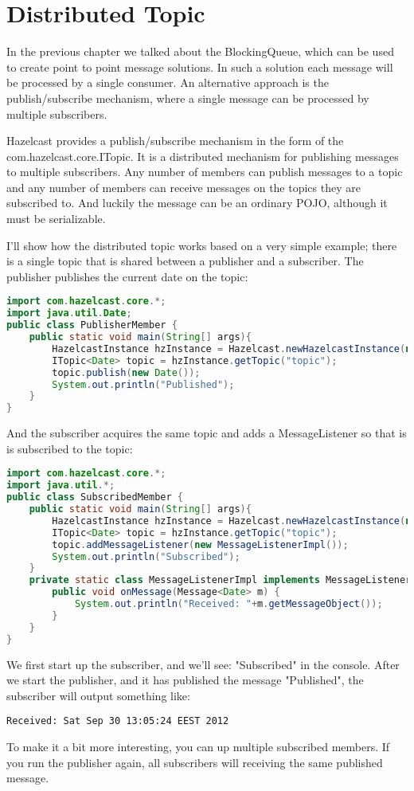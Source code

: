 \chapter{Distributed Topic}
In the previous chapter we talked about the BlockingQueue, which can be used to create point to point message solutions. In such a solution each message will be processed by a single consumer. An alternative approach is the publish/subscribe mechanism, where a single message can be processed by multiple subscribers.

Hazelcast provides a publish/subscribe mechanism in the form of the com.hazelcast.core.ITopic. It is a distributed mechanism for publishing messages to multiple subscribers. Any number of members can publish messages to a topic and any number of members can receive messages on the topics they are subscribed to. And luckily the message can be an ordinary POJO, although it must be serializable. 

I'll show how the distributed topic works based on a very simple example; there is a single topic that is shared between a publisher and a subscriber. The publisher publishes the current date on the topic:
\begin{lstlisting}[language=java]
import com.hazelcast.core.*;
import java.util.Date;
public class PublisherMember {
    public static void main(String[] args){
        HazelcastInstance hzInstance = Hazelcast.newHazelcastInstance(null);
        ITopic<Date> topic = hzInstance.getTopic("topic");
        topic.publish(new Date());
        System.out.println("Published");
    }
}
\end{lstlisting}
And the subscriber acquires the same topic and adds a MessageListener so that is is subscribed to the topic:
\begin{lstlisting}[language=java]
import com.hazelcast.core.*;
import java.util.*;
public class SubscribedMember {
    public static void main(String[] args){
        HazelcastInstance hzInstance = Hazelcast.newHazelcastInstance(null);
        ITopic<Date> topic = hzInstance.getTopic("topic");
        topic.addMessageListener(new MessageListenerImpl());
        System.out.println("Subscribed");
    }
    private static class MessageListenerImpl implements MessageListener<Date> {
        public void onMessage(Message<Date> m) {
            System.out.println("Received: "+m.getMessageObject());
        }
    }
}
\end{lstlisting}
We first start up the subscriber, and we'll see: "Subscribed" in the console. After we start the publisher, and it has published the message "Published", the subscriber will output something like:
\begin{lstlisting}
Received: Sat Sep 30 13:05:24 EEST 2012
\end{lstlisting}
To make it a bit more interesting, you can up multiple subscribed members. If you run the publisher again, all subscribers will receiving the same published message.

